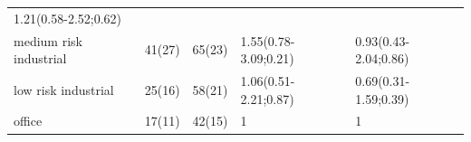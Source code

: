 \documentclass[
]{article}
\begin{document}
\begin{longtable}[]{@{}lllll@{}}
\begin{minipage}[t]{0.23\columnwidth}
1.21(0.58-2.52;0.62)\strut
\end{minipage}\tabularnewline
\begin{minipage}[t]{0.20\columnwidth}\raggedright
medium risk industrial\strut
\end{minipage} & \begin{minipage}[t]{0.08\columnwidth}\raggedright
41(27)\strut
\end{minipage} & \begin{minipage}[t]{0.10\columnwidth}\raggedright
65(23)\strut
\end{minipage} & \begin{minipage}[t]{0.24\columnwidth}\raggedright
1.55(0.78-3.09;0.21)\strut
\end{minipage} & \begin{minipage}[t]{0.23\columnwidth}\raggedright
0.93(0.43-2.04;0.86)\strut
\end{minipage}\tabularnewline
\begin{minipage}[t]{0.20\columnwidth}\raggedright
low risk industrial\strut
\end{minipage} & \begin{minipage}[t]{0.08\columnwidth}\raggedright
25(16)\strut
\end{minipage} & \begin{minipage}[t]{0.10\columnwidth}\raggedright
58(21)\strut
\end{minipage} & \begin{minipage}[t]{0.24\columnwidth}\raggedright
1.06(0.51-2.21;0.87)\strut
\end{minipage} & \begin{minipage}[t]{0.23\columnwidth}\raggedright
0.69(0.31-1.59;0.39)\strut
\end{minipage}\tabularnewline
\begin{minipage}[t]{0.20\columnwidth}\raggedright
office\strut
\end{minipage} & \begin{minipage}[t]{0.08\columnwidth}\raggedright
17(11)\strut
\end{minipage} & \begin{minipage}[t]{0.10\columnwidth}\raggedright
42(15)\strut
\end{minipage} & \begin{minipage}[t]{0.24\columnwidth}\raggedright
1\strut
\end{minipage} & \begin{minipage}[t]{0.23\columnwidth}\raggedright
1\strut
\end{minipage}\tabularnewline
\bottomrule
\end{longtable}
\end{document}
